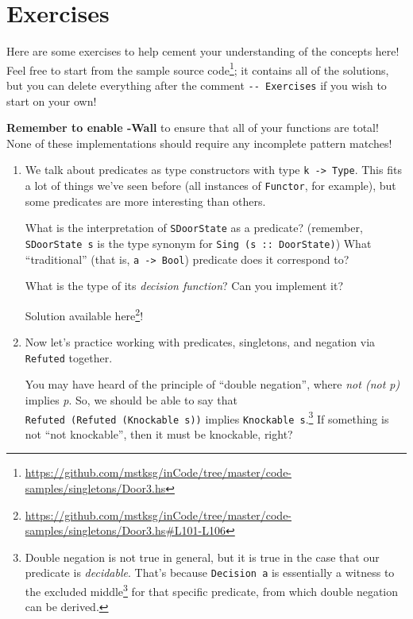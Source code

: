 \documentclass[]{article}
\renewcommand{\href}[2]{#2\footnote{\url{#1}}}
\begin{document}
\hypertarget{exercises}{%
\section{Exercises}\label{exercises}}

Here are some exercises to help cement your understanding of the concepts here!
Feel free to start from
\href{https://github.com/mstksg/inCode/tree/master/code-samples/singletons/Door3.hs}{the
sample source code}; it contains all of the solutions, but you can delete
everything after the comment \texttt{-\/-\ Exercises} if you wish to start on
your own!

\textbf{Remember to enable -Wall} to ensure that all of your functions are
total! None of these implementations should require any incomplete pattern
matches!

\begin{enumerate}
\def\labelenumi{\arabic{enumi}.}
\item
  We talk about predicates as type constructors with type
  \texttt{k\ -\textgreater{}\ Type}. This fits a lot of things we've seen before
  (all instances of \texttt{Functor}, for example), but some predicates are more
  interesting than others.

  What is the interpretation of \texttt{SDoorState} as a predicate? (remember,
  \texttt{SDoorState\ s} is the type synonym for
  \texttt{Sing\ (s\ ::\ DoorState)}) What ``traditional'' (that is,
  \texttt{a\ -\textgreater{}\ Bool}) predicate does it correspond to?

  What is the type of its \emph{decision function}? Can you implement it?

  Solution available
  \href{https://github.com/mstksg/inCode/tree/master/code-samples/singletons/Door3.hs\#L101-L106}{here}!
\item
  Now let's practice working with predicates, singletons, and negation via
  \texttt{Refuted} together.

  You may have heard of the principle of ``double negation'', where \emph{not
  (not p)} implies \emph{p}. So, we should be able to say that
  \texttt{Refuted\ (Refuted\ (Knockable\ s))} implies
  \texttt{Knockable\ s}.\footnote{Double negation is not true in general, but it
    is true in the case that our predicate is \emph{decidable}. That's because
    \texttt{Decision\ a} is essentially a witness to the
    \href{https://en.wikipedia.org/wiki/Law_of_excluded_middle}{excluded middle}
    for that specific predicate, from which double negation can be derived.} If
  something is not ``not knockable'', then it must be knockable, right?


\end{enumerate}
\end{document}
